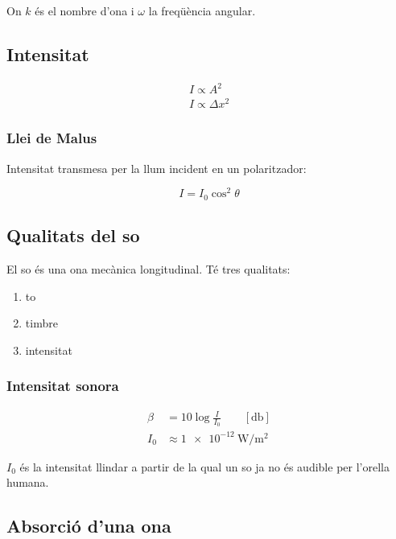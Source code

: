 On $k$ és el nombre d'ona i $\omega$ la freqüència angular.

\subsection{Intensitat}
\label{sub:intensitat}

\begin{align}
    I \propto A^2 \\
    I \propto \Delta x^2
\end{align}

\subsubsection{Llei de Malus}
\label{ssub:llei_de_malus}

Intensitat transmesa per la llum incident en un polaritzador:

\begin{equation}
    I = I_0 \cos^2 \theta
\end{equation}


\subsection{Qualitats del so}
\label{sub:qualitats_del_so}

El so és una ona mecànica longitudinal. Té tres qualitats:

\begin{enumerate}
    \item to
    \item timbre
    \item intensitat
\end{enumerate}


\subsubsection{Intensitat sonora}
\label{ssub:intensitat_sonora}

\begin{align}
    \beta &= 10\log \frac{I}{I_0} \qquad [\si{\decibel}]\\
    I_0 &\approx \SI{1e-12}{\watt\per\metre\squared}
\end{align}

$I_0$ és la intensitat llindar a partir de la qual un so ja no és audible per
l'orella humana.

\subsection{Absorció d'una ona}
\label{sub:absorcio_d_una_ona}

